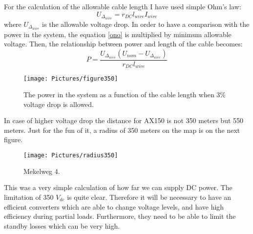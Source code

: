 \documentclass[]{scrartcl}
\begin{document}
For the calculation of the allowable cable length I have used simple Ohm's law:
\begin{equation}
U_{\Delta_{wire}} = r_{DC}l_{wire}I_{wire}
\label{ono}
\end{equation}
where $U_{\Delta_{wire}}$ is the allowable voltage drop. In order to have a comparison with the power in the system, the equation \ref{ono} is multiplied by minimum allowable voltage. Then, the relationship between power and length of the cable becomes:
\begin{equation}
P = \frac{U_{\Delta_{wire}}\left(U_{nom}-U_{\Delta_{wire}}\right)}{r_{DC}l_{wire}}
\end{equation}
\begin{figure}[h!]
	\centering
	\texttt{[image: Pictures/figure350]}
	\caption{The power in the system as a function of the cable length when 3\% voltage drop is allowed.}
	\label{fig:figure350}
\end{figure}
In case of higher voltage drop the distance for AX150 is not 350 meters but 550 meters. Just for the fun of it, a radius of 350 meters on the map is on the next figure.
\begin{figure}[h!]
	\centering
	\texttt{[image: Pictures/radius350]}
	\caption{Mekelweg 4.}
	\label{fig:radius350}
\end{figure}

This was a very simple calculation of how far we can supply DC power. The limitation of 350 $V_{dc}$ is quite clear. Therefore it will be necessary to have an efficient converters which are able to change voltage levels, and have high efficiency during partial loads. Furthermore, they need to be able to limit the standby losses which can be very high.





	\newpage
	{}
	
\end{document}
